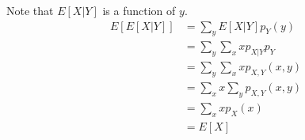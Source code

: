 \documentclass[../../probability-notes.tex]{subfiles}
\begin{document}
        Note that $E[X|Y]$ is a function of $y$.
        \begin{align*}
            E[E[X|Y]] &= \sum_{y} E[X|Y] p_Y(y)\\
                     &= \sum_{y} \sum_{x} xp_{X|Y}p_{Y}\\
                     &= \sum_{y}\sum_{x} xp_{X,Y}(x,y)\\
                     &= \sum_{x}x\sum_{y}p_{X,Y}(x,y)\\
                     &= \sum_{x} x p_{X}(x)\\
                     &= E[X]
        \end{align*}
\end{document}
